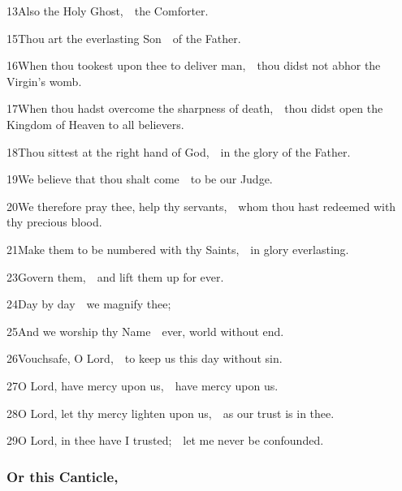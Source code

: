 13\enspace Also the Holy Ghost,\ \star\ the Comforter.



15\enspace Thou art the everlasting Son\ \star\ of the Father.

16\enspace When thou tookest upon thee to deliver man,\ \star\ thou didst not abhor the Virgin’s womb.

17\enspace When thou hadst overcome the sharpness of death,\ \star\ thou didst open the Kingdom of Heaven to all believers.

18\enspace Thou sittest at the right hand of God,\ \star\ in the glory of the Father.

19\enspace We believe that thou shalt come\ \star\ to be our Judge.

20\enspace We therefore pray thee, help thy servants,\ \star\ whom thou hast redeemed with thy precious blood.

21\enspace Make them to be numbered with thy Saints,\ \star\ in glory everlasting.



23\enspace Govern them,\ \star\ and lift them up for ever.

24\enspace Day by day\ \star\ we magnify thee;

25\enspace And we worship thy Name\ \star\ ever, world without end.

26\enspace Vouchsafe, O Lord,\ \star\ to keep us this day without sin.

27\enspace O Lord, have mercy upon us,\ \star\ have mercy upon us.

28\enspace O Lord, let thy mercy lighten upon us,\ \star\ as our trust is in thee.

29\enspace O Lord, in thee have I trusted;\ \star\ let me never be confounded.

\subsubsection{Or this Canticle,}

\subsection{}


